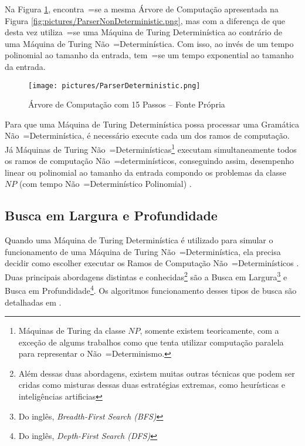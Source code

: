 {    Na Figura \ref{fig:pictures/ParserDeterministic.png},
    encontra~=se a mesma Árvore de Computação apresentada na Figura \ref{fig:pictures/ParserNonDeterministic.png},
    mas com a diferença de que desta vez utiliza~=se uma Máquina de Turing Determinística ao contrário de uma Máquina de Turing Não~=Determinística.
    Com isso,
    ao invés de um tempo polinomial ao tamanho da entrada,
    tem~=se um tempo exponential ao tamanho da entrada.
    \begin{figure}[h]
    \centering
    \texttt{[image: pictures/ParserDeterministic.png]}
    \caption[Árvore de Computação com 15 Passos]{Árvore de Computação com 15 Passos -- Fonte Própria}
    \label{fig:pictures/ParserDeterministic.png}
    \end{figure}

    Para que uma Máquina de Turing Determinística possa processar uma Gramática Não~=Determinística,
    é necessário execute cada um dos ramos de computação.
    Já Máquinas de Turing Não~=Determinísticas\footnote{
    Máquinas de Turing da classe $NP$,
    somente existem teoricamente,
    com a exceção de algums trabalhos como  que tenta utilizar computação paralela para representar o Não~=Determinismo.
    }
    executam simultaneamente todos os ramos de computação Não~=determinísticos,
    conseguindo assim, desempenho linear ou
    polinomial ao tamanho da entrada compondo os problemas da classe $NP$ (com tempo Não~=Determinístico Polinomial) \cite{hopcroftBook}.


\subsection{Busca em Largura e Profundidade}
\label{buscaEmLarguraEProfundidade}

    Quando uma Máquina de Turing Determinística é utilizado para simular o funcionamento de uma Máquina de Turing Não~=Determinística,
    ela precisa decidir como escolher executar os Ramos de Computação Não~=Determinísticos \cite{sipserBook}.
    Duas principais abordagens distintas e
    conhecidas\footnote{
    Além dessas duas abordagens,
    existem muitas outras técnicas que podem ser cridas como misturas dessas duas estratégias extremas,
    como heurísticas e inteligências artificias
    }
    são a Busca em Largura\footnote{
    Do inglês, \textit{Breadth-First Search (BFS)}
    }
    e Busca em Profundidade\footnote{
    Do inglês, \textit{Depth-First Search (DFS)}
    }.
    Os algoritmos funcionamento desses tipos de busca são detalhadas em .

}
